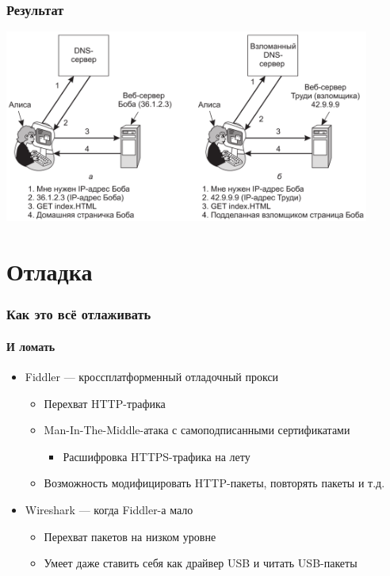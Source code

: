 \documentclass{../../slides-style}
\begin{document}
    \begin{frame}
        \frametitle{Результат}
        \begin{center}
            \includegraphics[width=0.9\textwidth]{dnsSpoofingResult.png}
        \end{center}
    \end{frame}

    \section{Отладка}

    \begin{frame}
        \frametitle{Как это всё отлаживать}
        \framesubtitle{И ломать}
        \begin{itemize}
            \item Fiddler --- кроссплатформенный отладочный прокси
            \begin{itemize}
                \item Перехват HTTP-трафика
                \item Man-In-The-Middle-атака с самоподписанными сертификатами
                \begin{itemize}
                    \item Расшифровка HTTPS-трафика на лету
                \end{itemize}
                \item Возможность модифицировать HTTP-пакеты, повторять пакеты и т.д.
            \end{itemize}
            \item Wireshark --- когда Fiddler-а мало
            \begin{itemize}
                \item Перехват пакетов на низком уровне
                \item Умеет даже ставить себя как драйвер USB и читать USB-пакеты
            \end{itemize}
        \end{itemize}
    \end{frame}
\end{document}
